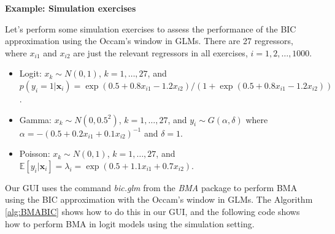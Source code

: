 \textbf{Example: Simulation exercises}

Let's perform some simulation exercises to assess the performance of the BIC approximation using the Occam's window in GLMs. There are 27 regressors, where $x_{i1}$ and $x_{i2}$ are just the relevant regressors in all exercises, $i=1,2,\dots,1000$.
\begin{itemize}
	\item Logit: $x_k\sim N(0, 1)$, $k =1,\dots,27$, and $p(y_i=1|\bm{x}_i)=\exp(0.5+0.8x_{i1}-1.2x_{i2})/(1+\exp(0.5+0.8x_{i1}-1.2x_{i2}))$.
	
	\item Gamma: $x_k\sim N(0, 0.5^2)$, $k =1,\dots,27$, and $y_i\sim G(\alpha,\delta)$ where $\alpha=-(0.5+0.2x_{i1}+0.1x_{i2})^{-1}$ and $\delta=1$.
	
	\item Poisson: $x_k\sim N(0, 1)$, $k =1,\dots,27$, and $\mathbb{E}[y_i|\bm{x}_i]=\lambda_i=\exp(0.5+1.1x_{i1}+0.7x_{i2})$.   
\end{itemize}

Our GUI uses the command \textit{bic.glm} from the \textit{BMA} package to perform BMA using the BIC approximation with the Occam's window in GLMs. The Algorithm \ref{alg:BMABIC} shows how to do this in our GUI, and the following code shows how to perform BMA in logit models using the simulation setting.

